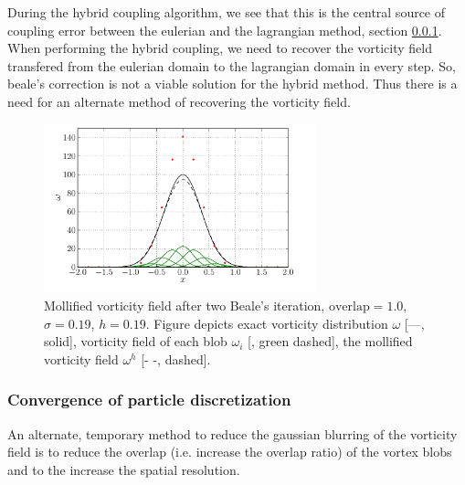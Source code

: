 During the hybrid coupling algorithm, we see that this is the central source of coupling error between the eulerian and the lagrangian method, section \ref{}. When performing the hybrid coupling, we need to recover the vorticity field transfered from the eulerian domain to the lagrangian domain in every step. So, beale's correction is not a viable solution for the hybrid method. Thus there is a need for an alternate method of recovering the vorticity field.


	\begin{figure}[t]
	\centering
	\includegraphics[width=0.7\textwidth]{figures/lagrangian/bealesCorrection.pdf}
	\caption{Mollified vorticity field after two Beale's iteration, $\mathrm{overlap}=1.0$, $\sigma=0.19$, $h=0.19$. Figure depicts exact vorticity distribution $\omega$ [---, solid], vorticity field of each blob $\omega_i$ [{\color{plotGreen}{---}}, green dashed], the mollified vorticity field $\omega^h$ [- -, dashed].  }
	\label{fig:bealesCorrection}
	\end{figure}



\subsubsection{Convergence of particle discretization}

An alternate, temporary method to reduce the gaussian blurring of the vorticity field is to reduce the overlap (i.e. increase the overlap ratio) of the vortex blobs and to the increase the spatial resolution.
	
